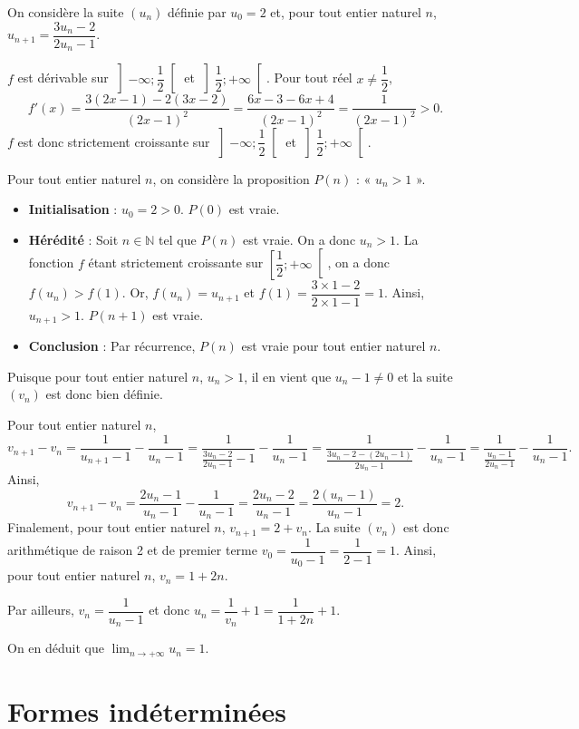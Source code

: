 \documentclass[11pt,fleqn]{book} %
\begin{document}
\begin{solution}On considère la suite $(u_n)$ définie par $u_0=2$ et, pour tout entier naturel $n$, $u_{n+1}=\dfrac{3u_n-2}{2u_n-1}$.

$f$ est dérivable sur $\left]-\infty ; \dfrac{1}{2} \right[$ et $\left]\dfrac{1}{2} ; + \infty \right[$. Pour tout réel $x\neq \dfrac{1}{2}$,
\[f'(x)=\dfrac{3(2x-1)-2(3x-2)}{(2x-1)^2} = \dfrac{6x-3-6x+4}{(2x-1)^2}=\dfrac{1}{(2x-1)^2} >0.\]
$f$ est donc strictement croissante sur $\left]-\infty ; \dfrac{1}{2} \right[$ et $\left]\dfrac{1}{2} ; + \infty \right[$.

Pour tout entier naturel $n$, on considère la proposition $P(n)$ : « $u_n >1$ ».
\begin{itemize}
\item \textbf{Initialisation} : $u_0=2>0$. $P(0)$ est vraie.
\item \textbf{Hérédité} : Soit $n\in \mathbb{N}$ tel que $P(n)$ est vraie. On a donc $u_n>1$. La fonction $f$ étant strictement croissante sur $\left[\dfrac{1}{2}; +\infty\right[$, on a donc $f(u_n)>f(1)$. Or, $f(u_n)=u_{n+1}$ et $f(1)=\dfrac{3 \times 1 -2}{2 \times 1 -1}=1$. Ainsi, $u_{n+1}>1$. $P(n+1)$ est vraie.
\item \textbf{Conclusion} : Par récurrence, $P(n)$ est vraie pour tout entier naturel $n$.
\end{itemize}

Puisque pour tout entier naturel $n$, $u_n>1$, il en vient que $u_n-1 \neq 0$ et la suite $(v_n)$ est donc bien définie.

Pour tout entier naturel $n$,
\[v_{n+1}-v_n=\dfrac{1}{u_{n+1}-1}-\dfrac{1}{u_n-1}=\dfrac{1}{\frac{3u_n-2}{2u_n-1}-1}-\dfrac{1}{u_n-1}=\dfrac{1}{\frac{3u_n-2-(2u_n-1)}{2u_n-1}}-\dfrac{1}{u_n-1}=\dfrac{1}{\frac{u_n-1}{2u_n-1}}-\dfrac{1}{u_n-1}.\]
Ainsi,
\[v_{n+1}-v_n=\dfrac{2u_n-1}{u_n-1}-\dfrac{1}{u_n-1}=\dfrac{2u_n-2}{u_n-1}=\dfrac{2(u_n-1)}{u_n-1}=2.\]
Finalement, pour tout entier naturel $n$, $v_{n+1}=2+v_n$. La suite $(v_n)$ est donc arithmétique de raison 2 et de premier terme $v_0=\dfrac{1}{u_0-1}=\dfrac{1}{2-1}=1$. Ainsi, pour tout entier naturel $n$, $v_n=1+2n$.

Par ailleurs, $v_n=\dfrac{1}{u_n-1}$ et donc $u_n=\dfrac{1}{v_n}+1=\dfrac{1}{1+2n}+1$.

On en déduit que  $\displaystyle\lim_{n \to +\infty}u_n =1$.
\end{solution}


\section*{Formes indéterminées}
\end{document}
